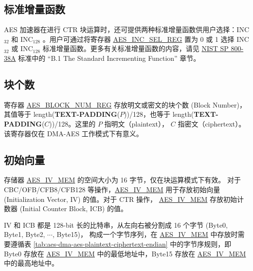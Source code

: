 \documentclass[main\_\_CN.tex]{subfiles}
\begin{document}
\subsection{标准增量函数}\label{sec:aes-Standard-Incrementing-Function}

AES 加速器在进行 CTR 块运算时，还可提供两种标准增量函数供用户选择：INC$_{32}$ 和 INC$_{128}$ 。用户可通过将寄存器 \hyperref[regdesc:AESINCSELREG]{AES\_INC\_SEL\_REG} 置为 0 或 1 选择 INC$_{32}$ 或 INC$_{128}$ 标准增量函数。更多有关标准增量函数的内容，请见 \href{https://nvlpubs.nist.gov/nistpubs/Legacy/SP/nistspecialpublication800-38a.pdf}{NIST SP 800-38A} 标准中的 “B.1 The Standard Incrementing Function” 章节。

\subsection{块个数}\label{sec:aes-block-number}

寄存器 \hyperref[regdesc:AESBLOCKNUMREG]{AES\_BLOCK\_NUM\_REG} 存放明文或密文的块个数 (Block Number)，其值等于 length({\bfseries TEXT-PADDING}($P$))/128，也等于 length({\bfseries TEXT-PADDING}($C$))/128。这里的 $P$ 指明文（plaintext）， $C$ 指密文（ciphertext）。该寄存器仅在 DMA-AES 工作模式下有意义。

\subsection{初始向量}\label{sec:aes-init-vector}

\label{memdesc:AESIVMEM}存储器 \hyperref[memdesc:AESIVMEM]{AES\_IV\_MEM} 的空间大小为 16 字节，仅在块运算模式下有效。
对于 CBC/OFB/CFB8/CFB128 等操作，\hyperref[memdesc:AESIVMEM]{AES\_IV\_MEM} 用于存放初始向量 (Initialization Vector, IV) 的值。对于 CTR 操作， \hyperref[memdesc:AESIVMEM]{AES\_IV\_MEM}  存放初始计数器 (Initial Counter Block, ICB) 的值。

IV 和 ICB 都是 128-bit 长的比特串，从左向右被分割成 16 个字节 (Byte0, Byte1, Byte2, \begin{math}\cdots\end{math}, Byte15)， 构成一个字节序列，在 \hyperref[memdesc:AESIVMEM]{AES\_IV\_MEM} 中存放时需要遵循表 \ref{tab:aes-dma-aes-plaintext-ciphertext-endian} 中的字节序规则，即 Byte0 存放在 \hyperref[memdesc:AESIVMEM]{AES\_IV\_MEM} 中的最低地址中，Byte15 存放在 \hyperref[memdesc:AESIVMEM]{AES\_IV\_MEM} 中的最高地址中。
\end{document}
